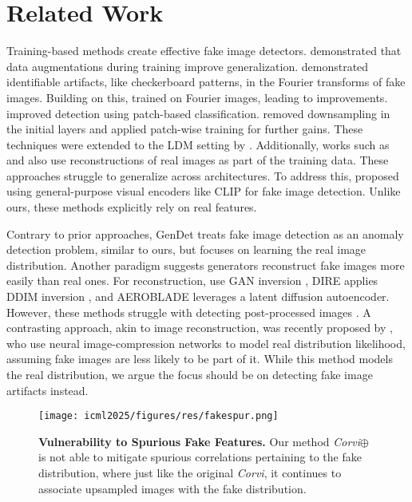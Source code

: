\section{Related Work}
Training-based methods create effective fake image detectors. \citet{wang2020cnn} demonstrated that data augmentations during training improve generalization. \citet{odena2016deconvolution} demonstrated identifiable artifacts, like checkerboard patterns, in the Fourier transforms of fake images. Building on this, \citet{zhang2019detecting} trained on Fourier images, leading to improvements. \citet{chai2020makesfakeimagesdetectable} improved detection using patch-based classification. \citet{gragnaniello2021gan} removed downsampling in the initial layers and applied patch-wise training for further gains. These techniques were extended to the LDM setting by \citet{corvi2023detection}. Additionally, works such as \citet{chendrct} and \citet{rajan2024effectiveness} also use reconstructions of real images as part of the training data. These approaches struggle to generalize across architectures. To address this, \citet{ojha2023towards} proposed using general-purpose visual encoders like CLIP \citep{radford2021learning} for fake image detection. Unlike ours, these methods explicitly rely on real features.


Contrary to prior approaches, GenDet \citep{zhu2023gendet} treats fake image detection as an anomaly detection problem, similar to ours, but focuses on learning the real image distribution. Another paradigm suggests generators reconstruct fake images more easily than real ones. For reconstruction, \citet{pasquini2023identifying} use GAN inversion \citep{xia2022gan}, DIRE \citep{wang2023dire} applies DDIM inversion \citep{song2020denoising}, and AEROBLADE \citep{ricker2024aeroblade} leverages a latent diffusion autoencoder. However, these methods struggle with detecting post-processed images \citep{rajan2024effectiveness}. A contrasting approach, akin to image reconstruction, was recently proposed by \citet{cozzolino2025zero}, who use neural image-compression networks \citep{cao2020lossless} to model real distribution likelihood, assuming fake images are less likely to be part of it. While this method models the real distribution, we argue the focus should be on detecting fake image artifacts instead.
\begin{figure}[t]
\begin{center}
\centerline{\texttt{[image: icml2025/figures/res/fakespur.png]}}

\caption{\textbf{Vulnerability to Spurious Fake Features.} Our method \emph{Corvi$\oplus$} is not able to mitigate spurious correlations pertaining to the fake distribution, where just like the original \emph{Corvi}, it continues to associate upsampled images with the fake distribution.}
\label{fig:corvi-fakespur}
\end{center}
\vskip -0.28in
\end{figure}